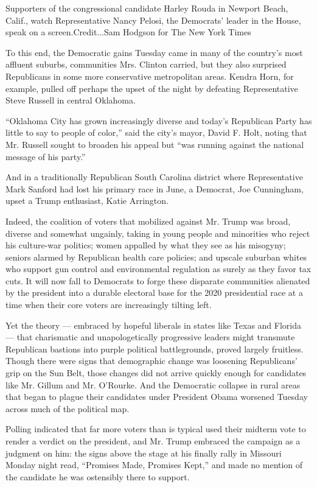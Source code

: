 Supporters of the congressional candidate Harley Rouda in Newport Beach,
Calif., watch Representative Nancy Pelosi, the Democrats' leader in the
House, speak on a screen.Credit...Sam Hodgson for The New York Times

To this end, the Democratic gains Tuesday came in many of the country's
most affluent suburbs, communities Mrs. Clinton carried, but they also
surprised Republicans in some more conservative metropolitan areas.
Kendra Horn, for example, pulled off perhaps the upset of the night by
defeating Representative Steve Russell in central Oklahoma.

``Oklahoma City has grown increasingly diverse and today's Republican
Party has little to say to people of color,'' said the city's mayor,
David F. Holt, noting that Mr. Russell sought to broaden his appeal but
``was running against the national message of his party.''

And in a traditionally Republican South Carolina district where
Representative Mark Sanford had lost his primary race in June, a
Democrat, Joe Cunningham, upset a Trump enthusiast, Katie Arrington.

Indeed, the coalition of voters that mobilized against Mr. Trump was
broad, diverse and somewhat ungainly, taking in young people and
minorities who reject his culture-war politics; women appalled by what
they see as his misogyny; seniors alarmed by Republican health care
policies; and upscale suburban whites who support gun control and
environmental regulation as surely as they favor tax cuts. It will now
fall to Democrats to forge these disparate communities alienated by the
president into a durable electoral base for the 2020 presidential race
at a time when their core voters are increasingly tilting left.

Yet the theory --- embraced by hopeful liberals in states like Texas and
Florida --- that charismatic and unapologetically progressive leaders
might transmute Republican bastions into purple political battlegrounds,
proved largely fruitless. Though there were signs that demographic
change was loosening Republicans' grip on the Sun Belt, those changes
did not arrive quickly enough for candidates like Mr. Gillum and Mr.
O'Rourke. And the Democratic collapse in rural areas that began to
plague their candidates under President Obama worsened Tuesday across
much of the political map.

Polling indicated that far more voters than is typical used their
midterm vote to render a verdict on the president, and Mr. Trump
embraced the campaign as a judgment on him: the signs above the stage at
his finally rally in Missouri Monday night read, ``Promises Made,
Promises Kept,'' and made no mention of the candidate he was ostensibly
there to support.

